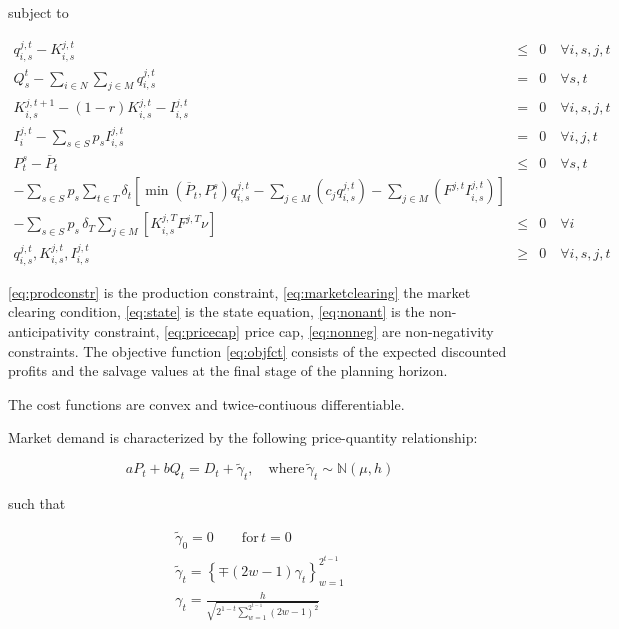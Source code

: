 subject to
  
\begin{eqnarray}  
q_{i,s}^{j,t} - K_{i,s}^{j,t} &\leq& 0 \quad \forall i,s,j,t \label{eq:prodconstr} \\
Q_s^t-\sum_{i\in N}\sum_{j\in M} q_{i,s}^{j,t} &=& 0 \quad \forall s,t \label{eq:marketclearing}\\
K_{i,s}^{j,t+1} - (1-r)K_{i,s}^{j,t}-I_{i,s}^{j,t} &=& 0 \quad \forall i,s,j,t \label{eq:state} \\
I_{i}^{j,t}-\sum_{s\in S}p_sI_{i,s}^{j,t} &=& 0 \quad \forall i,j,t \label{eq:nonant}\\
P_t^s - \overline{P}_t &\leq& 0 \quad \forall s,t \label{eq:pricecap}\\
-\sum_{s\in S}p_s \sum_{t\in T}\delta_t\left[\min\left(\overline{P}_t,P_t^s\right)q_{i,s}^{j,t} -\sum_{j\in M}\left(c_jq_{i,s}^{j,t}\right)-\sum_{j\in M}\left(F^{j,t}I_{i,s}^{j,t}\right)\right]\nonumber\\
  -\sum_{s\in S}p_s\,\delta_T \sum_{j\in M}\left[K_{i,s}^{j,T}F^{j,T}\nu\right] &\leq& 0 \quad \forall i\\
q_{i,s}^{j,t}, K_{i,s}^{j,t}, I_{i,s}^{j,t}  &\geq& 0 \quad \forall i,s,j,t\label{eq:nonneg}
\end{eqnarray}

\eqref{eq:prodconstr} is the production constraint, \eqref{eq:marketclearing} the market clearing condition, \eqref{eq:state} is the state equation, \eqref{eq:nonant} is the non-anticipativity constraint, \eqref{eq:pricecap} price cap, \eqref{eq:nonneg} are non-negativity constraints. The objective function \eqref{eq:objfct} consists of the expected discounted profits and the salvage values at the final stage of the planning horizon.

The cost functions are convex and twice-contiuous differentiable.

Market demand is characterized by the following price-quantity relationship:

\begin{equation}
  \label{eq:marketdemandpq}
  aP_t+bQ_t=D_t+\tilde{\gamma}_t, \quad \mbox{where}\, \tilde{\gamma}_t\sim\mathbb{N}(\mu,h)
\end{equation}

such that

\begin{eqnarray*}
  \label{eq:3}
  \tilde{\gamma}_0=0\qquad\mbox{for}\, t=0\\
   \tilde{\gamma}_t=\left\{\mp(2w-1)\gamma_t\right\}_{w=1}^{2^{t-1}}\\
   \gamma_t=\frac{h}{\sqrt{2^{1-t}\sum_{w=1}^{2^{t-1}}(2w-1)^2}}
\end{eqnarray*}

